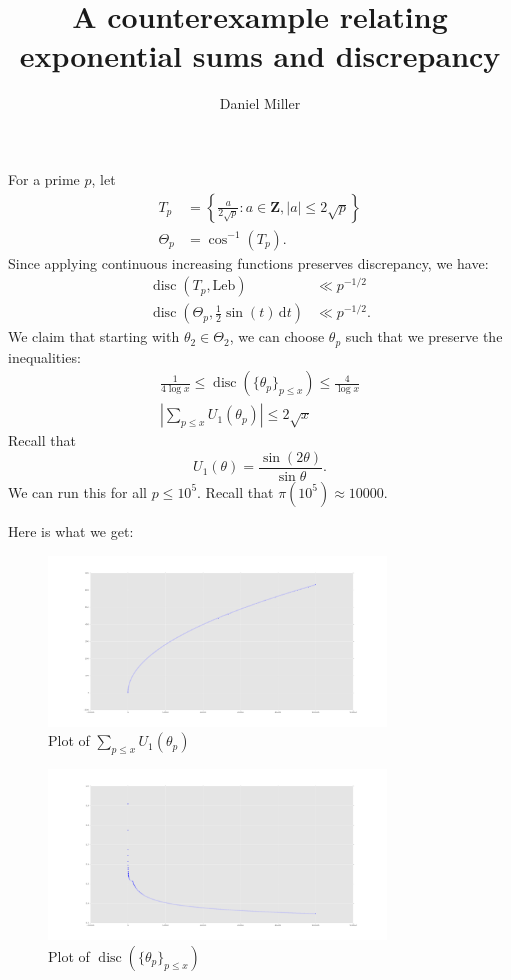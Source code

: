 \documentclass{article}
\title{A counterexample relating exponential sums and discrepancy}
\author{Daniel Miller}
\DeclareMathOperator{\disc}{disc}
\newcommand{\bZ}{\mathbf{Z}}
\newcommand{\dd}{\mathrm{d}}
\newcommand{\Leb}{\mathrm{Leb}}
\begin{document}
\maketitle





For a prime $p$, let 
\begin{align*}
	T_p &= \left\{ \frac{a}{2\sqrt p} : a\in \bZ, |a|\leqslant 2\sqrt p\right\} \\
	\Theta_p &= \cos^{-1}\left(T_p \right) .
\end{align*}
Since applying continuous increasing functions preserves discrepancy, we have:
\begin{align*}
	\disc(T_p,\Leb) &\ll p^{-1/2} \\
	\disc\left(\Theta_p, \frac 1 2 \sin(t)\, \dd t\right) &\ll p^{-1/2} .
\end{align*}
We claim that starting with $\theta_2\in \Theta_2$, we can choose 
$\theta_p$ such that we preserve the inequalities:
\begin{align*}
	\frac{1}{4\log x} \leqslant \disc(\{\theta_p\}_{p\leqslant x}) \leqslant \frac{4}{\log x} \\
	\left| \sum_{p\leqslant x} U_1(\theta_p)\right| \leqslant 2 \sqrt{x}
\end{align*}
Recall that 
\[
	U_1(\theta) = \frac{\sin(2\theta)}{\sin\theta} .
\]
We can run this for all $p\leqslant {10}^{5}$. Recall that 
$\pi(10^5) \approx 10000$. 

Here is what we get:
\begin{figure}[ht]
\caption{Plot of $\sum_{p\leqslant x} U_1(\theta_p)$}
\centering
\includegraphics[width=0.8\textwidth]{sums_abs}
\end{figure}

\begin{figure}[ht]
\caption{Plot of $\disc(\{\theta_p\}_{p\leqslant x})$}
\centering
\includegraphics[width=0.8\textwidth]{ks_data}
\end{figure}
\end{document}
